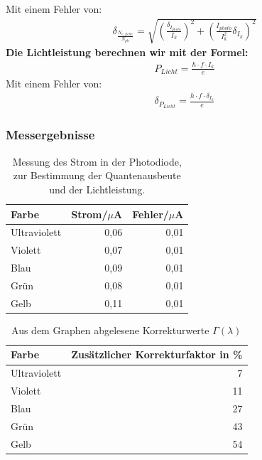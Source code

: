 \documentclass[12px]{scrartcl}
\begin{document}
Mit einem Fehler von:
\begin{align}
\delta_{\frac{N_{e,Zelle}}{N_{ph}}} = \sqrt{
\left(\frac{\delta_{I_{photo}}}{I_{k}}\right)^2+
\left(\frac{I_{photo}}{I_{k}^2}\delta_{I_{k}}\right)^2}
\end{align}
\textbf{Die Lichtleistung berechnen wir mit der Formel:}
\begin{align}
P_{Licht} = \frac{h\cdot f\cdot I_k}{e}
\label{eqn:p_l}
\end{align}
Mit einem Fehler von:
\begin{align}
\delta_{P_{Licht}} = \frac{h\cdot f\cdot \delta_{I_k}}{e}
\label{eqn:p_l_delta}
\end{align}

\subsubsection{Messergebnisse}
\begin{table}[H]
\caption{Messung des Strom in der Photodiode, zur Bestimmung der Quantenausbeute und der Lichtleistung.}
\begin{center}
\begin{tabular}{|l|r|r|}
\hline
Farbe & \multicolumn{1}{l|}{Strom/$\mu$A} & \multicolumn{1}{l|}{Fehler/$\mu$A} \\ \hline
Ultraviolett & 0,06 & 0,01 \\ \hline
Violett & 0,07 & 0,01 \\ \hline
Blau & 0,09 & 0,01 \\ \hline
Grün & 0,08 & 0,01 \\ \hline
Gelb & 0,11 & 0,01 \\ \hline
\end{tabular}
\end{center}
\label{tab:a_2.3}
\end{table}

\begin{table}[H]
\caption{Aus dem Graphen abgelesene Korrekturwerte $\Gamma(\lambda)$}
\begin{center}
\begin{tabular}{|l|r|}
\hline
Farbe & \multicolumn{1}{l|}{Zusätzlicher Korrekturfaktor in \%} \\ \hline
Ultraviolett & 7 \\ \hline
Violett & 11 \\ \hline
Blau & 27 \\ \hline
Grün & 43 \\ \hline
Gelb & 54 \\ \hline
\end{tabular}
\end{center}
\label{tab:a_2_3_k}
\end{table}
\end{document}
